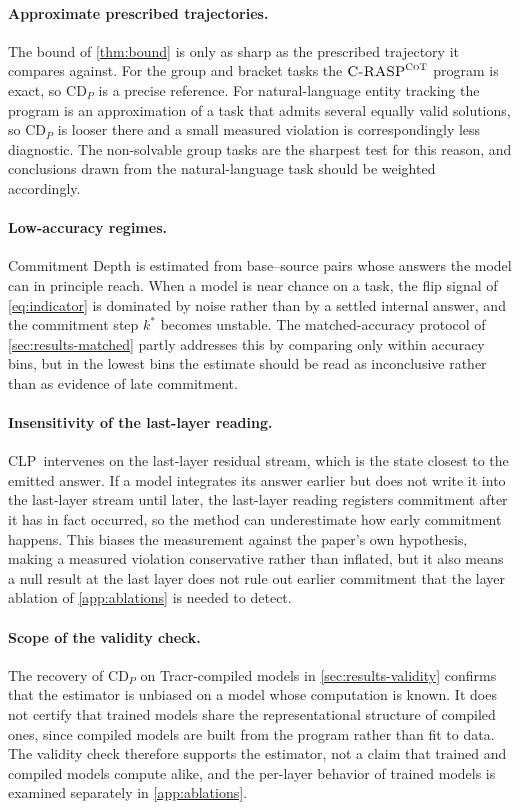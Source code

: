 \documentclass[11pt]{article}
\newcommand{\CDP}{\mathrm{CD}_{P}}
\newcommand{\stepk}{k}
\newcommand{\CLP}{\textsc{CLP}}
\newcommand{\CRASPCoT}{\textsc{C-RASP}^{\textsc{CoT}}}
\begin{document}
\paragraph{Approximate prescribed trajectories.} The bound of \cref{thm:bound}
is only as sharp as the prescribed trajectory it compares against. For the
group and bracket tasks the $\CRASPCoT$ program is exact, so $\CDP$ is a precise
reference. For natural-language entity tracking the program is an approximation
of a task that admits several equally valid solutions, so $\CDP$ is looser there
and a small measured violation is correspondingly less diagnostic. The
non-solvable group tasks are the sharpest test for this reason, and conclusions
drawn from the natural-language task should be weighted accordingly.

\paragraph{Low-accuracy regimes.} Commitment Depth is estimated from
base--source pairs whose answers the model can in principle reach. When a model
is near chance on a task, the flip signal of \cref{eq:indicator} is dominated by
noise rather than by a settled internal answer, and the commitment step
$\stepk^{*}$ becomes unstable. The matched-accuracy protocol of
\cref{sec:results-matched} partly addresses this by comparing only within
accuracy bins, but in the lowest bins the estimate should be read as
inconclusive rather than as evidence of late commitment.

\paragraph{Insensitivity of the last-layer reading.} \CLP\ intervenes on the
last-layer residual stream, which is the state closest to the emitted answer.
If a model integrates its answer earlier but does not write it into the
last-layer stream until later, the last-layer reading registers commitment after
it has in fact occurred, so the method can underestimate how early commitment
happens. This biases the measurement against the paper's own hypothesis, making
a measured violation conservative rather than inflated, but it also means a null
result at the last layer does not rule out earlier commitment that the layer
ablation of \cref{app:ablations} is needed to detect.

\paragraph{Scope of the validity check.} The recovery of $\CDP$ on
Tracr-compiled models in \cref{sec:results-validity} confirms that the estimator
is unbiased on a model whose computation is known. It does not certify that
trained models share the representational structure of compiled ones, since
compiled models are built from the program rather than fit to data. The validity
check therefore supports the estimator, not a claim that trained and compiled
models compute alike, and the per-layer behavior of trained models is examined
separately in \cref{app:ablations}.
\end{document}

